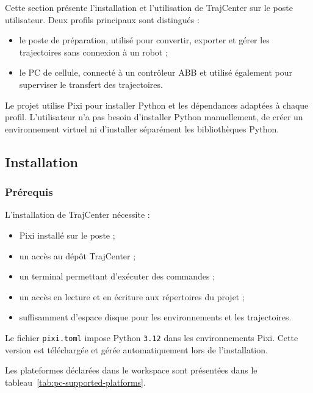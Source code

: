 \documentclass{rapportENSAM}
\begin{document}
Cette section présente l'installation et l'utilisation de TrajCenter sur le
poste utilisateur. Deux profils principaux sont distingués :

\begin{itemize}
    \item le poste de préparation, utilisé pour convertir, exporter et gérer
    les trajectoires sans connexion à un robot ;
    \item le PC de cellule, connecté à un contrôleur ABB et utilisé également
    pour superviser le transfert des trajectoires.
\end{itemize}

Le projet utilise Pixi pour installer Python et les dépendances adaptées à
chaque profil. L'utilisateur n'a pas besoin d'installer Python manuellement,
de créer un environnement virtuel ni d'installer séparément les bibliothèques
Python.




\subsection{Installation}
\label{subsec:pc-installation}



\subsubsection{Prérequis}
\label{subsubsec:pc-prerequisites}

L'installation de TrajCenter nécessite :

\begin{itemize}
    \item Pixi installé sur le poste ;
    \item un accès au dépôt TrajCenter ;
    \item un terminal permettant d'exécuter des commandes ;
    \item un accès en lecture et en écriture aux répertoires du projet ;
    \item suffisamment d'espace disque pour les environnements et les
    trajectoires.
\end{itemize}

Le fichier \texttt{pixi.toml} impose Python \texttt{3.12} dans les
environnements Pixi. Cette version est téléchargée et gérée automatiquement
lors de l'installation.

Les plateformes déclarées dans le workspace sont présentées dans le
tableau~\ref{tab:pc-supported-platforms}.
\end{document}
